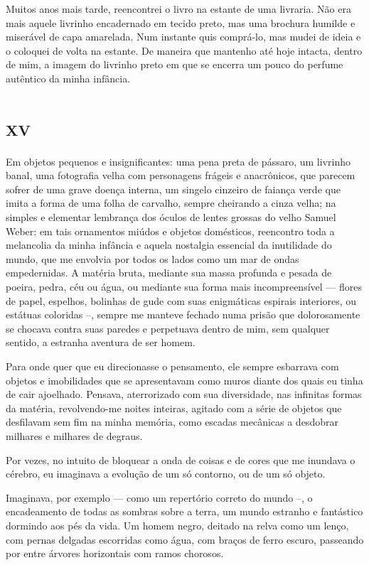 Muitos anos mais tarde, reencontrei o livro na estante de uma livraria. Não era mais aquele livrinho encadernado em tecido preto, mas uma brochura humilde e miserável de capa amarelada. Num instante quis comprá-lo, mas mudei de ideia e o coloquei de volta na estante. De maneira que mantenho até hoje intacta, dentro de mim, a imagem do livrinho preto em que se encerra um pouco do perfume autêntico da minha infância.


\chapter*{\huge\centering\textsc{xv}}

Em objetos pequenos e insignificantes: uma pena preta de pássaro, um livrinho banal, uma fotografia velha com personagens frágeis e anacrônicos, que parecem sofrer de uma grave doença interna, um singelo cinzeiro de faiança verde que imita a forma de uma folha de carvalho, sempre cheirando a cinza velha; na simples e elementar lembrança dos óculos de lentes grossas do velho Samuel Weber: em tais ornamentos miúdos e objetos domésticos, reencontro toda a melancolia da minha infância e aquela nostalgia essencial da inutilidade do mundo, que me envolvia por todos os lados como um mar de ondas empedernidas. A matéria bruta, mediante sua massa profunda e pesada de poeira, pedra, céu ou água, ou mediante sua forma mais incompreensível --- flores de papel, espelhos, bolinhas de gude com suas enigmáticas espirais interiores, ou estátuas coloridas --, sempre me manteve fechado numa prisão que dolorosamente se chocava contra suas paredes e perpetuava dentro de mim, sem qualquer sentido, a estranha aventura de ser homem.

Para onde quer que eu direcionasse o pensamento, ele sempre esbarrava com objetos e imobilidades que se apresentavam como muros diante dos quais eu tinha de cair ajoelhado.
Pensava, aterrorizado com sua diversidade, nas infinitas formas da matéria, revolvendo-me noites inteiras, agitado com a série de objetos que desfilavam sem fim na minha memória, como escadas mecânicas a desdobrar milhares e milhares de degraus.

Por vezes, no intuito de bloquear a onda de coisas e de cores que me inundava o cérebro, eu imaginava a evolução de um só contorno, ou de um só objeto.

Imaginava, por exemplo --- como um repertório correto do mundo --, o encadeamento de todas as sombras sobre a terra, um mundo estranho e fantástico dormindo aos pés da vida.
Um homem negro, deitado na relva como um lenço, com pernas delgadas escorridas como água, com braços de ferro escuro, passeando por entre árvores horizontais com ramos chorosos.

